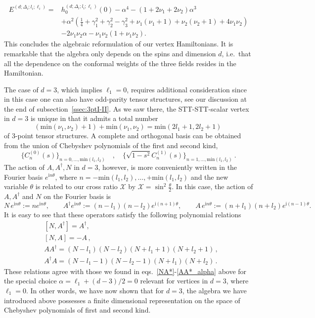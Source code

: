 \documentclass{article}
\def \Dg {\Delta}
\def \ag {\alpha}
\def \cg {\gamma}
\def \tg {\theta}
\begin{document}
\begin{align*}
E^{(d;\Dg_i;l_i;\ell_i)} =& h_0^{(d;\Dg_i;l_i;\ell_i)}(0) - \ag^4 - (1+2\nu_1+2\nu_2)\ag^3 \\
& +\ag^2 \left( \frac{1}{4} + \cg_1^2 + \cg_2^2- \cg_3^2 +\nu_1(\nu_1+1)+\nu_2(\nu_2+1)+4\nu_1\nu_2 \right) \\
&-2 \nu_1\nu_2 \ag -\nu_1\nu_2(1+\nu_1\nu_2).
\end{align*}
This concludes the algebraic reformulation of our vertex Hamiltonians.
It is remarkable that the algebra only depends on the spins and dimension 
$d$, i.e.\ that all the dependence on the conformal weights of the three 
fields resides in the Hamiltonian. 
\medskip 

 

The case of $d=3$, which implies $\ell_1=0$, requires additional consideration since in this case 
one can also have 
odd-parity tensor structures, see our discussion at the end of subsection~\ref{ssec:3ptI-II}. 
As we saw there, the STT-STT-scalar vertex in $d=3$ is unique in that it admits a total 
number
\begin{equation}
  ( \mathrm{min}(\nu_1,\nu_2)+1)+\mathrm{min}(\nu_1,\nu_2) = \mathrm{min}(2l_1+1,2l_2+1)\, 
\end{equation}
of 3-point tensor structures. A complete and orthogonal basis can be obtained from the union of 
Chebyshev polynomials of the first and second kind,
$$\{C_n^{(0)}(s)\}_{n=0,\dots,\mathrm{min}(l_1,l_2)} \quad , \quad 
\{ \sqrt{1-s^2} C_n^{(1)}(s)\}_{n=1,\dots,\mathrm{min}(l_1,l_2)}\ . $$  
The action of $A,A^{\dagger},N$ in $d=3$, however, is more conveniently written in the 
Fourier basis $e^{\mathrm{i}n\tg}$, where $n=-\mathrm{min}(l_1,l_2),\dots,+\mathrm{min}(l_1,l_2)$ 
and the new variable $\theta$ is related to our cross ratio $\mathcal{X}$ by 
$\mathcal{X} = \sin^2 \frac{\tg}{2}$. In this case, the action of 
$A, A^\dagger$ and $N$ on the Fourier basis is 
\begin{equation*}
N \, e^{\mathrm{i} n \tg} := n e^{\mathrm{i} n \tg}, \qquad A^{\dagger}  e^{\mathrm{i} n \tg} := 
(n-l_1)(n-l_2) e^{\mathrm{i} (n+1) \tg}, \qquad A \, e^{\mathrm{i} n\tg} := (n+l_1)(n+l_2) e^{\mathrm{i} (n-1) \tg}. 
\end{equation*}
It is easy to see that these operators satisfy the following polynomial relations
\begin{align}
&[N,A^{\dagger}] = A^{\dagger}, \label{NA*3} \\
&[N,A] = -A\,, \label{NA3} \\
& A A^{\dagger} = (N-l_1)(N-l_2)(N+l_1+1)(N+l_2+1)\,, \label{AA*} \\
& A^{\dagger} A = (N-l_1-1)(N-l_2-1)(N+l_1)(N+l_2)\,. \label{A*A} 
\end{align}
These relations agree with those we found in eqs.\ \eqref{NA*}-\eqref{AA*_alpha} above for the 
special choice $\ag = \ell_1 + (d-3)/2 = 0$ relevant for vertices in $d=3$, where
$\ell_1 = 0$. In other words, we have now shown that for $d=3$, the algebra we have introduced
above possesses a finite dimensional representation on the space of Chebyshev polynomials of 
first and second kind. 
\end{document}
